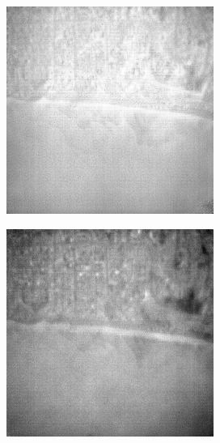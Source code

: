 \begin{figure}
\begin{subfigure}[b]{0.19\textwidth}
        \label{fig:cycleGan}
    \end{subfigure}
    \hfill
    \begin{subfigure}[b]{0.19\textwidth}
        \centering
        \includegraphics[width=\textwidth]{../figs/outputs/cut/28.png}
        \label{fig:cut}
    \end{subfigure}
    \hfill
    \begin{subfigure}[b]{0.19\textwidth}
        \centering
        \includegraphics[width=\textwidth]{../figs/outputs/petit/28.png}

\end{subfigure}
\end{figure}
